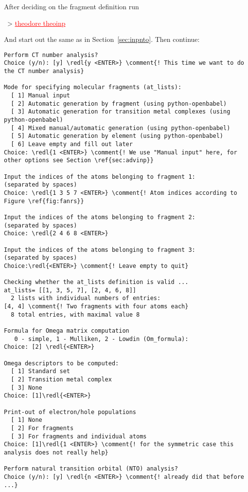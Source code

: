 \documentclass[DIV=12,headings=normal]{scrartcl}
\newcommand{\comment}[1]{\textcolor{blue}{#1}}
\newcommand{\redl}[1]{{\textcolor{red}{\underline{#1}}}}
\newcommand{\comm}[1]{
\small
~> \redl{#1}
\normalsize
}
\newcounter{number}
\begin{document}
After deciding on the fragment definition run 

\comm{theodore theoinp}

And start out the same as in Section~\ref{sec:inpnto}. Then continue:

\scriptsize
\begin{Verbatim}[commandchars=\\\{\}]
Perform CT number analysis?
Choice (y/n): [y] \redl{y <ENTER>} \comment{! This time we want to do the CT number analysis}

Mode for specifying molecular fragments (at_lists):
  [ 1] Manual input
  [ 2] Automatic generation by fragment (using python-openbabel)
  [ 3] Automatic generation for transition metal complexes (using python-openbabel)
  [ 4] Mixed manual/automatic generation (using python-openbabel)
  [ 5] Automatic generation by element (using python-openbabel)
  [ 6] Leave empty and fill out later
Choice: \redl{1 <ENTER>} \comment{! We use "Manual input" here, for other options see Section \ref{sec:advinp}}

Input the indices of the atoms belonging to fragment 1:
(separated by spaces)
Choice: \redl{1 3 5 7 <ENTER>} \comment{! Atom indices according to Figure \ref{fig:fanrs}}

Input the indices of the atoms belonging to fragment 2:
(separated by spaces)
Choice: \redl{2 4 6 8 <ENTER>}

Input the indices of the atoms belonging to fragment 3:
(separated by spaces)
Choice:\redl{<ENTER>} \comment{! Leave empty to quit}

Checking whether the at_lists definition is valid ...
at_lists= [[1, 3, 5, 7], [2, 4, 6, 8]]
  2 lists with individual numbers of entries:
[4, 4] \comment{! Two fragments with four atoms each}
  8 total entries, with maximal value 8

Formula for Omega matrix computation
   0 - simple, 1 - Mulliken, 2 - Lowdin (Om_formula):
Choice: [2] \redl{<ENTER>}

Omega descriptors to be computed:
  [ 1] Standard set
  [ 2] Transition metal complex
  [ 3] None
Choice: [1]\redl{<ENTER>}

Print-out of electron/hole populations
  [ 1] None
  [ 2] For fragments
  [ 3] For fragments and individual atoms
Choice: [1]\redl{1 <ENTER>} \comment{! for the symmetric case this analysis does not really help}

Perform natural transition orbital (NTO) analysis?
Choice (y/n): [y] \redl{n <ENTER>} \comment{! already did that before ...}


\end{Verbatim}
\end{document}
